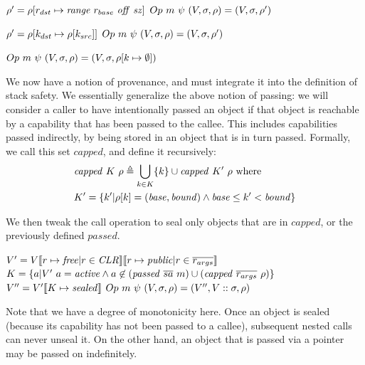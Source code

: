 \documentclass[10pt,conference]{ieeetran}%
\theoremstyle{definition}
\begin{document}
           {\(\rho' = \rho[r_{dst} \mapsto \mathit{range} ~ r_{base} ~ \mathit{off} ~ \mathit{sz}]\)}
           {\(Op ~ m ~ \psi ~ (V,\sigma,\rho) = (V,\sigma,\rho')\)}

           {\(\rho' = \rho[k_{dst} \mapsto \rho[k_{src}]]\)}
           {\(Op ~ m ~ \psi ~ (V,\sigma,\rho) = (V,\sigma,\rho')\)}

         {\(Op ~ m ~ \psi ~ (V,\sigma,\rho) = (V,\sigma,\rho[k \mapsto \emptyset])\)}

We now have a notion of provenance, and must integrate it into the definition of
stack safety. We essentially generalize the above notion of passing: we will consider
a caller to have intentionally passed an object if that object is reachable by
a capability that has been passed to the callee. This includes capabilities passed
indirectly, by being stored in an object that is in turn passed. Formally, we call
this set \(\mathit{capped}\), and define it recursively:
%
\[\begin{split}
& \mathit{capped} ~ K ~ \rho \triangleq \bigcup_{k \in K} \{k\} \cup \mathit{capped} ~ K' ~ \rho \textnormal{ where} \\
& K' = \{k' |\rho[k] = (\mathit{base},\mathit{bound})
\land \mathit{base} \leq k' < \mathit{bound}\} \\
\end{split}\]

We then tweak the call operation to seal only objects that are in \(\mathit{capped}\), or
the previously defined \(\mathit{passed}\).

               {\(V' = V \llbracket r \mapsto \mathit{free} | r \in \mathit{CLR} \rrbracket
                 \llbracket r \mapsto \mathit{public} | r \in \overline{r_{args}} \rrbracket\)}
               {\(K = \{a | V' ~ a = \mathit{active} \land a \not \in (\mathit{passed} ~ \overline{sa} ~ m) \cup (\mathit{capped} ~ \overline{r_{args}} ~ \rho) \}\)}
               {\(V'' = V'\llbracket K \mapsto \mathit{sealed} \rrbracket\)}
               {\(Op ~ m ~ \psi ~ (V,\sigma,\rho) =
                 (V'',V::\sigma,\rho)\)}

Note that we have a degree of monotonicity here. Once an object is sealed (because its
capability has not been passed to a callee), subsequent nested calls can never unseal it.
On the other hand, an object that is passed via a pointer may be passed on indefinitely.
\end{document}

